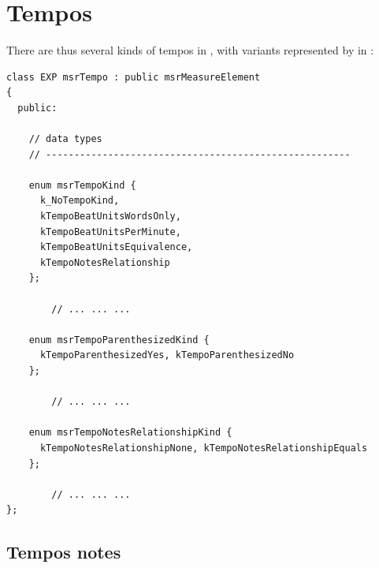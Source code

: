 \section{Tempos}\label{Tempos}

There are thus several kinds of tempos in \msrRepr, with variants represented by  in :
\begin{lstlisting}[language=CPlusPlus]
class EXP msrTempo : public msrMeasureElement
{
  public:

    // data types
    // ------------------------------------------------------

    enum msrTempoKind {
      k_NoTempoKind,
      kTempoBeatUnitsWordsOnly,
      kTempoBeatUnitsPerMinute,
      kTempoBeatUnitsEquivalence,
      kTempoNotesRelationship
    };

		// ... ... ...

    enum msrTempoParenthesizedKind {
      kTempoParenthesizedYes, kTempoParenthesizedNo
    };

		// ... ... ...

    enum msrTempoNotesRelationshipKind {
      kTempoNotesRelationshipNone, kTempoNotesRelationshipEquals
    };

		// ... ... ...
};
\end{lstlisting}


\subsection{Tempos notes}\label{Tempos notes}


